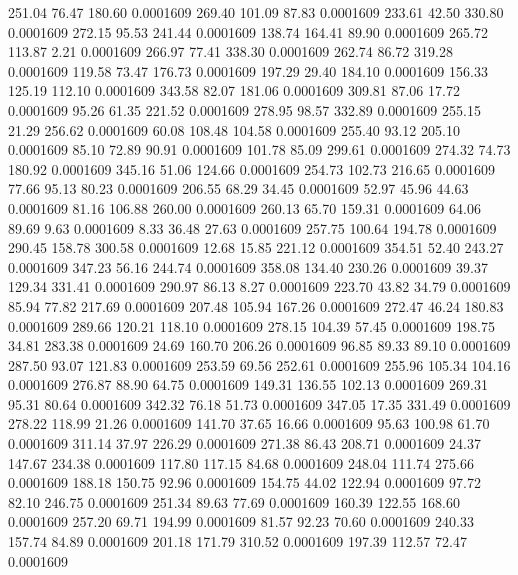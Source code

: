  251.04   76.47  180.60   0.0001609
 269.40  101.09   87.83   0.0001609
 233.61   42.50  330.80   0.0001609
 272.15   95.53  241.44   0.0001609
 138.74  164.41   89.90   0.0001609
 265.72  113.87    2.21   0.0001609
 266.97   77.41  338.30   0.0001609
 262.74   86.72  319.28   0.0001609
 119.58   73.47  176.73   0.0001609
 197.29   29.40  184.10   0.0001609
 156.33  125.19  112.10   0.0001609
 343.58   82.07  181.06   0.0001609
 309.81   87.06   17.72   0.0001609
  95.26   61.35  221.52   0.0001609
 278.95   98.57  332.89   0.0001609
 255.15   21.29  256.62   0.0001609
  60.08  108.48  104.58   0.0001609
 255.40   93.12  205.10   0.0001609
  85.10   72.89   90.91   0.0001609
 101.78   85.09  299.61   0.0001609
 274.32   74.73  180.92   0.0001609
 345.16   51.06  124.66   0.0001609
 254.73  102.73  216.65   0.0001609
  77.66   95.13   80.23   0.0001609
 206.55   68.29   34.45   0.0001609
  52.97   45.96   44.63   0.0001609
  81.16  106.88  260.00   0.0001609
 260.13   65.70  159.31   0.0001609
  64.06   89.69    9.63   0.0001609
   8.33   36.48   27.63   0.0001609
 257.75  100.64  194.78   0.0001609
 290.45  158.78  300.58   0.0001609
  12.68   15.85  221.12   0.0001609
 354.51   52.40  243.27   0.0001609
 347.23   56.16  244.74   0.0001609
 358.08  134.40  230.26   0.0001609
  39.37  129.34  331.41   0.0001609
 290.97   86.13    8.27   0.0001609
 223.70   43.82   34.79   0.0001609
  85.94   77.82  217.69   0.0001609
 207.48  105.94  167.26   0.0001609
 272.47   46.24  180.83   0.0001609
 289.66  120.21  118.10   0.0001609
 278.15  104.39   57.45   0.0001609
 198.75   34.81  283.38   0.0001609
  24.69  160.70  206.26   0.0001609
  96.85   89.33   89.10   0.0001609
 287.50   93.07  121.83   0.0001609
 253.59   69.56  252.61   0.0001609
 255.96  105.34  104.16   0.0001609
 276.87   88.90   64.75   0.0001609
 149.31  136.55  102.13   0.0001609
 269.31   95.31   80.64   0.0001609
 342.32   76.18   51.73   0.0001609
 347.05   17.35  331.49   0.0001609
 278.22  118.99   21.26   0.0001609
 141.70   37.65   16.66   0.0001609
  95.63  100.98   61.70   0.0001609
 311.14   37.97  226.29   0.0001609
 271.38   86.43  208.71   0.0001609
  24.37  147.67  234.38   0.0001609
 117.80  117.15   84.68   0.0001609
 248.04  111.74  275.66   0.0001609
 188.18  150.75   92.96   0.0001609
 154.75   44.02  122.94   0.0001609
  97.72   82.10  246.75   0.0001609
 251.34   89.63   77.69   0.0001609
 160.39  122.55  168.60   0.0001609
 257.20   69.71  194.99   0.0001609
  81.57   92.23   70.60   0.0001609
 240.33  157.74   84.89   0.0001609
 201.18  171.79  310.52   0.0001609
 197.39  112.57   72.47   0.0001609
